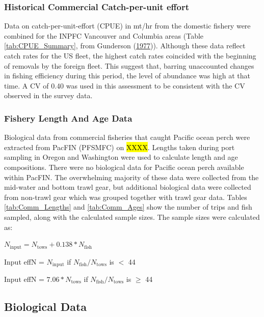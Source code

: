 \documentclass[12pt,]{article}
\begin{document}
\subsubsection{Historical Commercial Catch-per-unit
effort}\label{historical-commercial-catch-per-unit-effort}

Data on catch-per-unit-effort (CPUE) in mt/hr from the domestic fishery
were combined for the INPFC Vancouver and Columbia areas (Table
\ref{tab:CPUE_Summary}, from Gunderson
(\protect\hyperlink{ref-gunderson_population_1977}{1977})). Although
these data reflect catch rates for the US fleet, the highest catch rates
coincided with the beginning of removals by the foreign fleet. This
suggest that, barring unaccounted changes in fishing efficiency during
this period, the level of abundance was high at that time. A CV of 0.40
was used in this assessment to be consistent with the CV observed in the
survey data.

\subsubsection{Fishery Length And Age
Data}\label{fishery-length-and-age-data}

Biological data from commercial fisheries that caught Pacific ocean
perch were extracted from PacFIN (PFSMFC) on \hl{XXXX}. Lengths taken
during port sampling in Oregon and Washington were used to calculate
length and age compositions. There were no biological data for Pacific
ocean perch available within PacFIN. The overwhelming majority of these
data were collected from the mid-water and bottom trawl gear, but
additional biological data were collected from non-trawl gear which was
grouped together with trawl gear data. Tables \ref{tab:Comm_Lengths} and
\ref{tab:Comm_Ages} show the number of trips and fish sampled, along
with the calculated sample sizes. The sample sizes were calculated as:

\begin{centering}

$N_{\text{input}} = N_{\text{tows}} + 0.138 * N_{\text{fish}}$

Input effN = $N_{\text{input}}$ if $N_{\text{fish}}/N_{\text{tows}}$ is $<$ 44

Input effN = $7.06 * N_{\text{tows}}$ if $N_{\text{fish}}/N_{\text{tows}}$ is $\geq$ 44

\end{centering}

\subsection{Biological Data}\label{biological-data}
\end{document}
